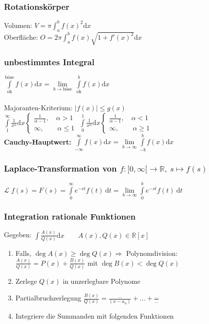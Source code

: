 \documentclass[6pt,a4paper]{scrartcl}
\newcommand{\Ra}[0]{\ensuremath{\Rightarrow}}
\newcommand{\ra}[0]{\ensuremath{\rightarrow}}
\begin{document}
\begin{multicols}{4}
\subsubsection{Rotationskörper}
Volumen: $V = \pi \int_a^b f(x)^2 \mathrm dx$\\
Oberfläche: $O = 2 \pi \int_a^b f(x) \sqrt{1 + f'(x)^2} \mathrm dx$

\subsubsection{unbestimmtes Integral}
$\int\limits_{\text{ok}}^{\text{böse}} f(x) \mathrm dx = \lim\limits_{b\rightarrow \text{böse}}\ \int\limits_{\text{ok}}^b f(x) \mathrm dx$\\
\\
Majoranten-Kriterium: $|f(x)|\le g(x)$\\
$\int\limits_{1}^{\infty} \frac{1}{x^\alpha} \mathrm dx \begin{cases} \frac{1}{\alpha -1}, \quad \alpha > 1 \\ \infty, \qquad \alpha \le 1 \end{cases}$ \qquad
$\int\limits_{0}^{1} \frac{1}{x^\alpha} \mathrm dx \begin{cases} \frac{1}{\alpha -1}, \quad \alpha < 1 \\ \infty, \qquad \alpha \ge 1 \end{cases}$\\
\textbf{Cauchy-Hauptwert:} $\int\limits_{-\infty}^{\infty} f(x) \mathrm dx = \lim\limits_{b\rightarrow\infty} \int\limits_{-b}^b f(x) \mathrm dx$

\subsubsection{Laplace-Transformation von $f: [0,\infty[ \ra \mathbb R,\ s \mapsto f(s)$}
$\mathcal L \; f(s) = F(s) = \int\limits_{0}^{\infty} e^{-st} f(t)\ \mathrm dt = \lim\limits_{b \ra \infty} \int\limits_{0}^{b} e^{-st} f(t)\ \mathrm dt$

\subsubsection{Integration rationale Funktionen}
Gegeben: $\int \frac{A(x)}{Q(x)} \mathrm dx \qquad A(x),Q(x)\in \mathbb R[x]$
\begin{enumerate}\itemsep0pt
\item Falls, $\deg A(x) \ge \deg Q(x) \Ra$ Polynomdivision: \\ $\frac{A(x)}{Q(x)} = P(x) + \frac{B(x)}{Q(x)}$ mit $\deg B(x) < \deg Q(x)$
\item Zerlege $Q(x)$ in unzerlegbare Polynome
\item Partialbruchzerlegung $\frac{B(x)}{Q(x)} = \frac{\ldots}{(x - a_n)} + \ldots + \frac{\ldots}{\ldots}$
\item Integriere die Summanden mit folgenden Funktionen
\end{enumerate}


\end{multicols}
\end{document}
